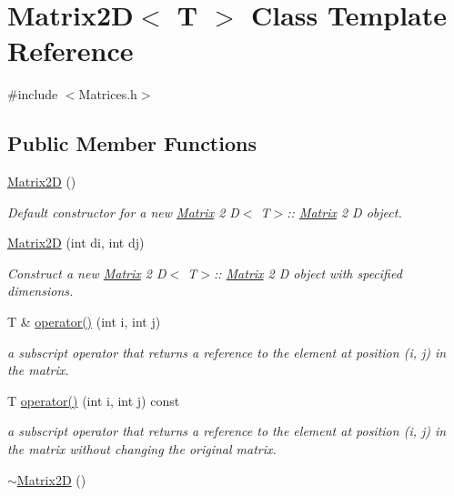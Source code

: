 \hypertarget{classMatrix2D}{}\section{Matrix2D$<$ T $>$ Class Template Reference}
\label{classMatrix2D}


{\ttfamily \#include $<$Matrices.\+h$>$}

\subsection*{Public Member Functions}
\begin{DoxyCompactItemize}
\item 
\mbox{\hyperlink{classMatrix2D_a950bb2aa76c86e057d91f430d5a27b57}{Matrix2D}} ()
\begin{DoxyCompactList}\small\item\em Default constructor for a new \mbox{\hyperlink{classMatrix}{Matrix}} 2 D$<$ T$>$\+:\+: \mbox{\hyperlink{classMatrix}{Matrix}} 2 D object. \end{DoxyCompactList}\item 
\mbox{\hyperlink{classMatrix2D_ac93acc71341e612cf8b23d4308c561f8}{Matrix2D}} (int di, int dj)
\begin{DoxyCompactList}\small\item\em Construct a new \mbox{\hyperlink{classMatrix}{Matrix}} 2 D$<$ T$>$\+:\+: \mbox{\hyperlink{classMatrix}{Matrix}} 2 D object with specified dimensions. \end{DoxyCompactList}\item 
T \& \mbox{\hyperlink{classMatrix2D_abcb61863666c4e17352c9fd2fc0a254a}{operator()}} (int i, int j)
\begin{DoxyCompactList}\small\item\em a subscript operator that returns a reference to the element at position (i, j) in the matrix. \end{DoxyCompactList}\item 
T \mbox{\hyperlink{classMatrix2D_a1a14d98d090d0d1cbda97a8fa797f1c5}{operator()}} (int i, int j) const
\begin{DoxyCompactList}\small\item\em a subscript operator that returns a reference to the element at position (i, j) in the matrix without changing the original matrix. \end{DoxyCompactList}\item 
\mbox{\hyperlink{classMatrix2D_a6b86d001220161af2136ba49fd8b26b9}{$\sim$\+Matrix2D}} ()

\end{DoxyCompactItemize}
